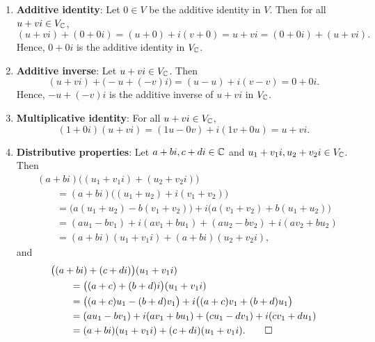 \begin{exc}
\begin{solution}
\begin{enumerate}[label=\arabic*)]
\begin{align*}
    &\qquad= \bigl((ac-bd)u-(ad+bc)v\bigr)+i\bigl((ac-bd)v+(ad+bc)u\bigr)\\
    &\qquad= \bigl(a(cu-dv)-b(du+cv)\bigr)+i\bigl(a(du+cv)+b(cu-dv)\bigr)\\
    &\qquad= (a+bi)\bigl((cu-dv)+i(du+cv)\bigr)\\
    &\qquad= (a+bi)\bigl((c+di)(u+vi)\bigr).
  \end{align*}
\item \textbf{Additive identity}: Let $0\in V$ be the additive identity in $V$.
  Then for all $u+vi\in V_{\mathbb{C}}$,
  \[ (u+vi)+(0+0i) = (u+0)+i(v+0) = u+vi = (0+0i)+(u+vi). \]
  Hence, $0+0i$ is the additive identity in $V_{\mathbb{C}}$.
\item \textbf{Additive inverse}: Let $u+vi\in V_{\mathbb{C}}$. Then
  \[ (u+vi)+\bigl(-u+(-v)i\bigr) = (u-u)+i(v-v) = 0+0i. \]
  Hence, $-u+(-v)i$ is the additive inverse of $u+vi$ in $V_{\mathbb{C}}$.
\item \textbf{Multiplicative identity}: For all $u+vi\in V_{\mathbb{C}}$,
  \[ (1+0i)(u+vi) = (1u-0v)+i(1v+0u) = u+vi. \]
\item \textbf{Distributive properties}: Let $a+bi,c+di\in\mathbb{C}$ and
  $u_1+v_1i,u_2+v_2i\in V_{\mathbb{C}}$. Then
  \begin{align*}
  &(a+bi)\bigl((u_1+v_1i)+(u_2+v_2i)\bigr)\\
    &\qquad= (a+bi)\bigl((u_1+u_2)+i(v_1+v_2)\bigr)\\
    &\qquad= \bigl(a(u_1+u_2)-b(v_1+v_2)\bigr)+i\bigl(a(v_1+v_2)+b(u_1+u_2)\bigr)\\
    &\qquad= (au_1-bv_1)+i(av_1+bu_1)+(au_2-bv_2)+i(av_2+bu_2)\\
    &\qquad= (a+bi)(u_1+v_1i)+(a+bi)(u_2+v_2i),
  \end{align*}
  and
  \begin{align*}
  &\bigl((a+bi)+(c+di)\bigr)(u_1+v_1i)\\
    &\qquad= \bigl((a+c)+(b+d)i\bigr)(u_1+v_1i)\\
    &\qquad= \bigl((a+c)u_1-(b+d)v_1\bigr)+i\bigl((a+c)v_1+(b+d)u_1\bigr)\\
    &\qquad= (au_1-bv_1)+i(av_1+bu_1)+(cu_1-dv_1)+i(cv_1+du_1)\\
    &\qquad= (a+bi)(u_1+v_1i)+(c+di)(u_1+v_1i). \qedhere
  \end{align*}
\end{enumerate}
\end{solution}
\end{exc}
